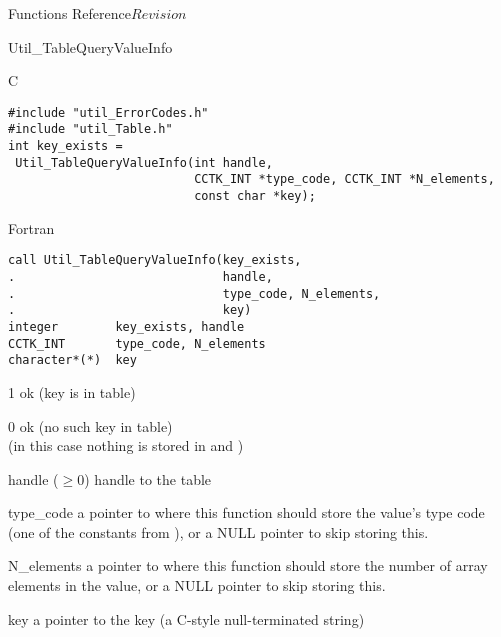 \begin{cactuspart}{ Functions Reference}{}{$Revision$}
\begin{FunctionDescription}{Util\_TableQueryValueInfo}
\begin{SynopsisSection}
\begin{Synopsis}{C}
\begin{verbatim}
#include "util_ErrorCodes.h"
#include "util_Table.h"
int key_exists =
 Util_TableQueryValueInfo(int handle,
                          CCTK_INT *type_code, CCTK_INT *N_elements,
                          const char *key);
\end{verbatim}
\end{Synopsis}
\begin{Synopsis}{Fortran}
\begin{verbatim}
call Util_TableQueryValueInfo(key_exists,
.                             handle,
.                             type_code, N_elements,
.                             key)
integer        key_exists, handle
CCTK_INT       type_code, N_elements
character*(*)  key
\end{verbatim}
\end{Synopsis}
\end{SynopsisSection}

\begin{ResultSection}
\begin{Result}{\rm 1}
ok (key is in table)
\end{Result}
\begin{Result}{\rm 0}
ok (no such key in table)\\
(in this case nothing is stored in  and )
\end{Result}
\end{ResultSection}

\begin{ParameterSection}
\begin{Parameter}{handle ($\ge 0$)}
handle to the table
\end{Parameter}
\begin{Parameter}{type\_code}
a pointer to where this function should store the value's type code
(one of the  constants from ),
or a NULL pointer to skip storing this.
\end{Parameter}
\begin{Parameter}{N\_elements}
a pointer to where this function should store
the number of array elements in the value,
or a NULL pointer to skip storing this.
\end{Parameter}
\begin{Parameter}{key}
a pointer to the key (a C-style null-terminated string)
\end{Parameter}
\end{ParameterSection}


\end{FunctionDescription}
\end{cactuspart}
